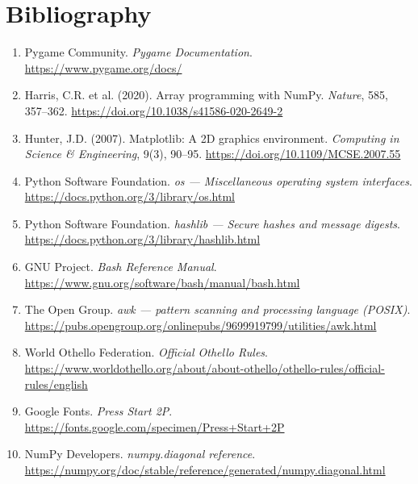 \documentclass[12pt,a4paper]{article}
\begin{document}
\newpage
\section{Bibliography}

\begin{enumerate}[leftmargin=*]

    \item Pygame Community. \textit{Pygame Documentation}.
          \url{https://www.pygame.org/docs/}

    \item Harris, C.R. et al. (2020). Array programming with NumPy.
          \textit{Nature}, 585, 357--362.
          \url{https://doi.org/10.1038/s41586-020-2649-2}

    \item Hunter, J.D. (2007). Matplotlib: A 2D graphics environment.
          \textit{Computing in Science \& Engineering}, 9(3), 90--95.
          \url{https://doi.org/10.1109/MCSE.2007.55}

    \item Python Software Foundation. \textit{os --- Miscellaneous operating system interfaces}.
          \url{https://docs.python.org/3/library/os.html}

    \item Python Software Foundation. \textit{hashlib --- Secure hashes and message digests}.
          \url{https://docs.python.org/3/library/hashlib.html}

    \item GNU Project. \textit{Bash Reference Manual}.
          \url{https://www.gnu.org/software/bash/manual/bash.html}

    \item The Open Group. \textit{awk --- pattern scanning and processing language (POSIX)}.
          \url{https://pubs.opengroup.org/onlinepubs/9699919799/utilities/awk.html}

    \item World Othello Federation. \textit{Official Othello Rules}.
          \url{https://www.worldothello.org/about/about-othello/othello-rules/official-rules/english}

    \item Google Fonts. \textit{Press Start 2P}.
          \url{https://fonts.google.com/specimen/Press+Start+2P}

    \item NumPy Developers. \textit{numpy.diagonal reference}.
          \url{https://numpy.org/doc/stable/reference/generated/numpy.diagonal.html}

\end{enumerate}
\end{document}
